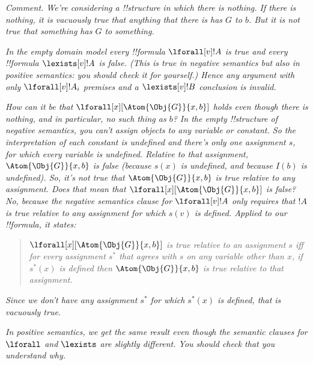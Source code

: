 \documentclass[../../../include/open-logic-section]{subfiles}
\begin{document}
\begin{prob}
\begin{ans}
\begin{enumerate}
    \emph{Comment. We're considering a !!{structure} in which there is
    nothing. If there is nothing, it is vacuously true that anything
    that there is has $G$ to $b$. But it is not true that something
    has $G$ to something.}

    \emph{In the empty domain model every !!{formula}
    $\lforall[v]!A$ is true and every !!{formula} $\lexists[v]!A$ is
    false. (This is true in negative semantics but also in positive
    semantics: you should check it for yourself.) Hence any argument
    with only $\lforall[v]!A_i$ premises and a $\lexists[v]!B$
    conclusion is invalid.}

    \emph{How can it be that $\lforall[x][\Atom{\Obj{G}}{x,b}]$ holds
    even though there is nothing, and in particular, no such thing as
    $b$? In the empty !!{structure} of negative semantics, you can't
    assign objects to any variable or constant. So the interpretation
    of each constant is undefined and there's only one assignment $s$,
    for which every variable is undefined. Relative to that
    assignment, $\Atom{\Obj{G}}{x,b}$ is false (because $s(x)$ is
    undefined, and because $I(b)$ is undefined). So, it's \emph{not}
    true that $\Atom{\Obj{G}}{x,b}$ is true relative to \emph{any}
    assignment. Does that mean that $\lforall[x][\Atom{\Obj{G}}{x,b}]$
    is false? No, because the negative semantics clause for
    $\lforall[v]!A$ only requires that $!A$ is true relative to any
    assignment \emph{for which $s(v)$ is defined}. Applied to our
    !!{formula}, it states:}
    \begin{quote}
    \emph{ $\lforall[x][\Atom{\Obj{G}}{x,b}]$ is true relative to an
    assignment $s$ iff for every assignment $s^*$ that agrees with $s$
    on any variable other than $x$, \emph{if} $s^*(x)$ is defined then
    $\Atom{\Obj{G}}{x,b}$ is true relative to that assignment. }
    \end{quote}
    \emph{Since we don't have any assignment $s^*$ for which $s^*(x)$
    is defined, that is vacuously true.}

    \emph{In positive semantics, we get the same result even 
    though the semantic clauses for $\lforall$ and $\lexists$
    are slightly different. You should check that you understand why.}

    \end{enumerate}

    \clearpage
    \end{ans}
\end{prob}
\end{document}
